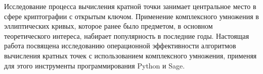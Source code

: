 Исследование процесса вычисления кратной точки занимает центральное место в сфере криптографии с открытым ключом. 
Применение комплексного умножения в эллиптических кривых, которое ранее было предметом, в основном теоретического интереса, набирает популярность в последние годы. 
Настоящая работа посвящена исследованию операционной эффективности алгоритмов вычисления кратных точек с использованием комплексного умножения, применяя для этого инструменты программирования Python и Sage.